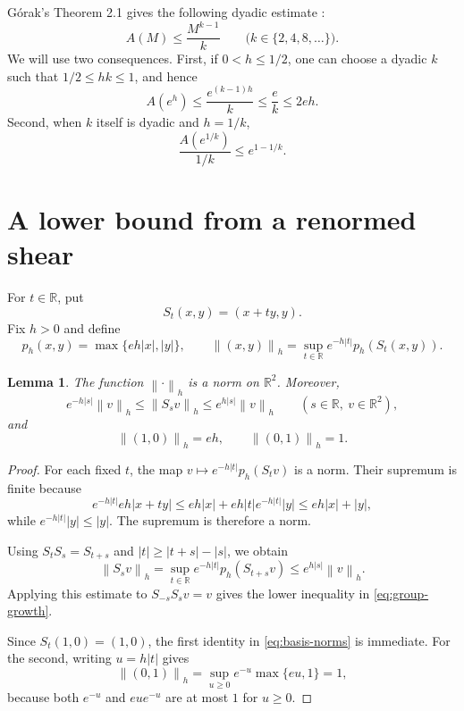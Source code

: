 \documentclass[11pt]{article}
\newtheorem{lemma}[theorem]{Lemma}
\theoremstyle{remark}
\newcommand{\R}{\mathbb{R}}
\newcommand{\norm}[1]{\left\lVert #1\right\rVert}
\begin{document}
G\'orak's Theorem 2.1 gives the following dyadic estimate
\cite{Gorak}:
\begin{equation}\label{eq:dyadic}
 A(M)\le \frac{M^{k-1}}{k}
 \qquad\bigl(k\in\{2,4,8,\ldots\}\bigr).
\end{equation}
We will use two consequences.  First, if $0<h\le 1/2$, one can choose a
dyadic $k$ such that $1/2\le hk\le1$, and hence
\begin{equation}\label{eq:local-linear}
 A(e^h)\le \frac{e^{(k-1)h}}k\le \frac e k\le 2eh.
\end{equation}
Second, when $k$ itself is dyadic and $h=1/k$,
\begin{equation}\label{eq:dyadic-subsequence}
 \frac{A(e^{1/k})}{1/k}\le e^{1-1/k}.
\end{equation}

\section{A lower bound from a renormed shear}

For $t\in\R$, put
\[
 S_t(x,y)=(x+ty,y).
\]
Fix $h>0$ and define
\[
 p_h(x,y)=\max\{eh|x|,|y|\},
 \qquad
 \norm{(x,y)}_h=\sup_{t\in\R}e^{-h|t|}p_h(S_t(x,y)).
\]

\begin{lemma}\label{lem:shear-norm}
The function $\norm{\cdot}_h$ is a norm on $\R^2$.  Moreover,
\begin{equation}\label{eq:group-growth}
 e^{-h|s|}\norm{v}_h\le \norm{S_s v}_h
 \le e^{h|s|}\norm{v}_h
 \qquad(s\in\R,\ v\in\R^2),
\end{equation}
and
\begin{equation}\label{eq:basis-norms}
 \norm{(1,0)}_h=eh,
 \qquad
 \norm{(0,1)}_h=1.
\end{equation}
\end{lemma}

\begin{proof}
For each fixed $t$, the map $v\mapsto e^{-h|t|}p_h(S_t v)$ is a norm.
Their supremum is finite because
\[
 e^{-h|t|}eh|x+ty|
 \le eh|x|+eh|t|e^{-h|t|}|y|
 \le eh|x|+|y|,
\]
while $e^{-h|t|}|y|\le|y|$.  The supremum is therefore a norm.

Using $S_tS_s=S_{t+s}$ and $|t|\ge |t+s|-|s|$, we obtain
\[
 \norm{S_s v}_h
 =\sup_{t\in\R}e^{-h|t|}p_h(S_{t+s}v)
 \le e^{h|s|}\norm{v}_h.
\]
Applying this estimate to $S_{-s}S_s v=v$ gives the lower inequality in
\eqref{eq:group-growth}.

Since $S_t(1,0)=(1,0)$, the first identity in \eqref{eq:basis-norms} is
immediate.  For the second, writing $u=h|t|$ gives
\[
 \norm{(0,1)}_h
 =\sup_{u\ge0}e^{-u}\max\{eu,1\}=1,
\]
because both $e^{-u}$ and $eu e^{-u}$ are at most $1$ for $u\ge0$.
\end{proof}
\end{document}

